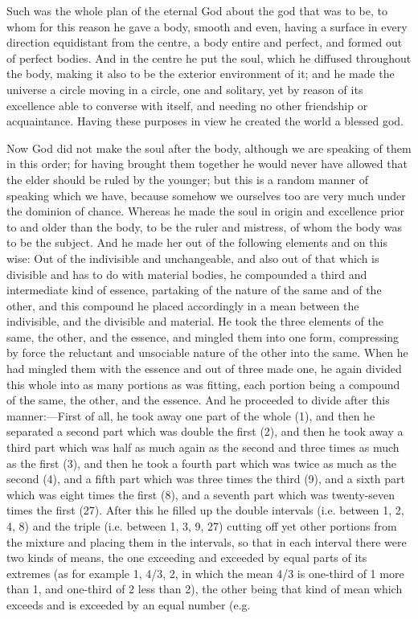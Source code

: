 Such was the whole plan of the eternal God about the god that was to be,
to whom for this reason he gave a body, smooth and even, having a surface
in every direction equidistant from the centre, a body entire and perfect,
and formed out of perfect bodies. And in the centre he put the soul, which
he diffused throughout the body, making it also to be the exterior
environment of it; and he made the universe a circle moving in a circle,
one and solitary, yet by reason of its excellence able to converse with
itself, and needing no other friendship or acquaintance. Having these
purposes in view he created the world a blessed god.

Now God did not make the soul after the body, although we are speaking of
them in this order; for having brought them together he would never have
allowed that the elder should be ruled by the younger; but this is a
random manner of speaking which we have, because somehow we ourselves too
are very much under the dominion of chance. Whereas he made the soul in
origin and excellence prior to and older than the body, to be the ruler
and mistress, of whom the body was to be the subject. And he made her out
of the following elements and on this wise: Out of the indivisible and
unchangeable, and also out of that which is divisible and has to do with
material bodies, he compounded a third and intermediate kind of essence,
partaking of the nature of the same and of the other, and this compound he
placed accordingly in a mean between the indivisible, and the divisible
and material. He took the three elements of the same, the other, and the
essence, and mingled them into one form, compressing by force the
reluctant and unsociable nature of the other into the same. When he had
mingled them with the essence and out of three made one, he again divided
this whole into as many portions as was fitting, each portion being a
compound of the same, the other, and the essence. And he proceeded to
divide after this manner:—First of all, he took away one part of the
whole (1), and then he separated a second part which was double the first
(2), and then he took away a third part which was half as much again as
the second and three times as much as the first (3), and then he took a
fourth part which was twice as much as the second (4), and a fifth part
which was three times the third (9), and a sixth part which was eight
times the first (8), and a seventh part which was twenty-seven times the
first (27). After this he filled up the double intervals (i.e. between 1,
2, 4, 8) and the triple (i.e. between 1, 3, 9, 27) cutting off yet other
portions from the mixture and placing them in the intervals, so that in
each interval there were two kinds of means, the one exceeding and
exceeded by equal parts of its extremes (as for example 1, 4/3, 2, in
which the mean 4/3 is one-third of 1 more than 1, and one-third of 2 less
than 2), the other being that kind of mean which exceeds and is exceeded
by an equal number (e.g.

